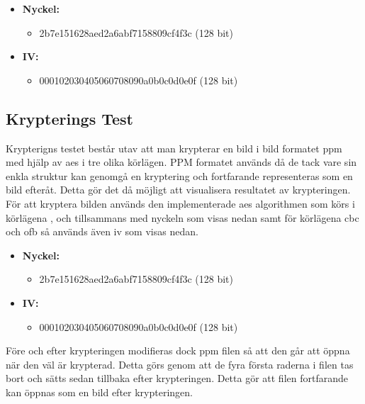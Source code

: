 \begin{itemize}
    \item []\textbf{Nyckel:}
    \begin{itemize}
        \item 2b7e151628aed2a6abf7158809cf4f3c (128 bit)
    \end{itemize}
    \item []\textbf{IV:}
    \begin{itemize}
        \item 000102030405060708090a0b0c0d0e0f (128 bit)
    \end{itemize}
\end{itemize}

\subsection{Krypterings Test} %
\label{sec:krypterings-test}
Krypterigns testet består utav att man krypterar en bild i bild formatet \gls{ppm} med hjälp av \acrshort{aes} i tre olika körlägen.
PPM formatet används då de tack vare sin enkla struktur kan genomgå en kryptering och fortfarande representeras som en bild
efteråt. Detta gör det då möjligt att visualisera resultatet av krypteringen. För att kryptera bilden används den implementerade
\acrshort{aes} algorithmen som körs i körlägena ,  och  tillsammans med nyckeln som visas nedan samt
för körlägena \acrshort{cbc} och \acrshort{ofb} så används även \acrshort{iv} som visas nedan.

\begin{itemize}
    \item []\textbf{Nyckel:}
    \begin{itemize}
        \item 2b7e151628aed2a6abf7158809cf4f3c (128 bit)
    \end{itemize}
    \item []\textbf{IV:}
    \begin{itemize}
        \item 000102030405060708090a0b0c0d0e0f (128 bit)
    \end{itemize}
\end{itemize}

Före och efter krypteringen modifieras dock \gls{ppm} filen så att den går att öppna när den väl är krypterad. Detta görs genom att de fyra
första raderna i filen tas bort och sätts sedan tillbaka efter krypteringen. Detta gör att filen fortfarande kan öppnas som en bild
efter krypteringen.

